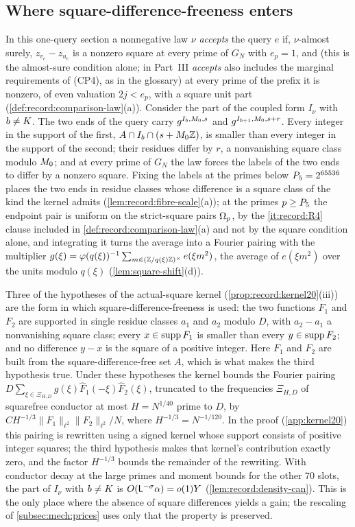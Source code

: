 \subsection{Where square-difference-freeness enters}\label{subsec:mech:kernel}

In this one-query section a nonnegative law $\nu$ \emph{accepts}
the query $e$ if, $\nu$-almost surely, $z_{v_e}-z_{u_e}$ is a
nonzero square at every prime of $G_N$ with $e_p=1$, and (this is
the almost-sure condition alone; in Part~III \emph{accepts} also
includes the marginal requirements of (CP4), as in the glossary)
at every prime of the prefix it is nonzero, of even valuation $2j<e_p$, with
a square unit part (\cref{def:record:comparison-law}(a)). Consider the part
of the coupled form $I_\nu$ with $b\ne K$. The two ends of the query carry
$g^{I_b,M_0,s}$ and $g^{I_{b+1},M_0,s+r}$. Every integer in the support
of the first, $A\cap I_b\cap(s+M_0\mathbb Z)$, is smaller than every integer in the
support of the second; their residues differ by $r$, a nonvanishing square class
modulo $M_0$; and at every prime of $G_N$ the law forces the labels of the
two ends to differ by a nonzero square. Fixing the labels at the primes
below $P_5=2^{65536}$ places the two ends in residue classes whose
difference is a square class of the kind the kernel admits
(\cref{lem:record:fibre-scale}(a)); at the primes $p\ge P_5$ the endpoint
pair is uniform on the strict-square pairs $\Omega_{p}$, by the
\ref{it:record:R4} clause included in
\cref{def:record:comparison-law}(a) and not by the square condition
alone, and integrating it turns the average
into a Fourier pairing with the multiplier
$g(\xi)=\varphi(q(\xi))^{-1}\sum_{m\in(\mathbb Z/q(\xi)\mathbb Z)^\times}e(\xi m^2)$, the average
of $e(\xi m^2)$ over the units modulo $q(\xi)$ (\cref{lem:square-shift}(d)).

Three of the hypotheses of the actual-square kernel
(\cref{prop:record:kernel20}(iii)) are the form in which square-difference-freeness
is used: the two functions $F_1$ and $F_2$ are supported in single residue
classes $a_1$ and $a_2$ modulo $D$, with $a_2-a_1$ a nonvanishing square class;
every $x\in\operatorname{supp} F_1$ is smaller than every $y\in\operatorname{supp} F_2$; and no difference
$y-x$ is the square of a positive integer. Here $F_1$ and $F_2$ are built
from the square-difference-free set $A$, which is what makes the third
hypothesis true. Under these hypotheses the kernel bounds the Fourier
pairing $D\sum_{\xi\in\Xi_{H,D}}g(\xi)\widehat F_1(-\xi)\widehat F_2(\xi)$, truncated to
the frequencies $\Xi_{H,D}$ of squarefree conductor at most $H=N^{1/40}$ prime
to $D$, by $CH^{-1/3}\|F_1\|_{\ell^2}\|F_2\|_{\ell^2}/N$, where
$H^{-1/3}=N^{-1/120}$. In the proof
(\cref{app:kernel20}) this pairing is rewritten using a signed kernel whose
support consists of positive integer squares; the third hypothesis makes
that kernel's contribution exactly zero, and the factor $H^{-1/3}$ bounds
the remainder of the rewriting. With conductor decay at the large primes and
moment bounds for the other $70$ slots, the part of $I_\nu$ with $b\ne K$ is
$O(\mathsf L^{-\sigma}\alpha)=o(1)Y$ (\cref{lem:record:density-can}). This is the
only place where the absence of square differences yields a gain; the
rescaling of \cref{subsec:mech:prices} uses only that the property is
preserved.

